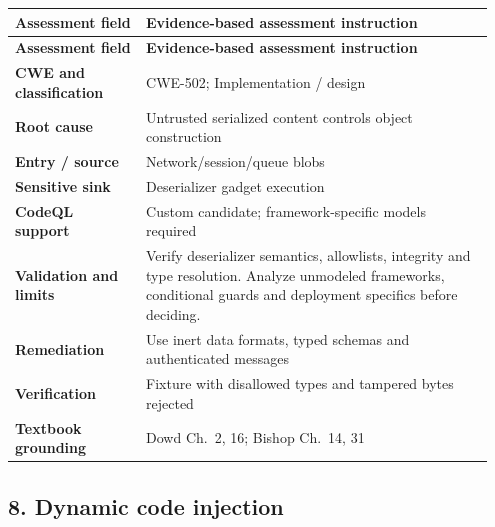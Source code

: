 \documentclass[11pt,letterpaper,oneside]{book}
\begin{document}
\small
\setlength{\tabcolsep}{2pt}
\renewcommand{\arraystretch}{1.18}
\begin{longtable}{>{\raggedright\arraybackslash}p{0.26\linewidth}>{\raggedright\arraybackslash}p{0.69\linewidth}}
\toprule
\textbf{Assessment field} & \textbf{Evidence-based assessment instruction}\\
\midrule
\endfirsthead
\toprule
\textbf{Assessment field} & \textbf{Evidence-based assessment instruction}\\
\midrule
\endhead
\textbf{CWE and classification} & CWE-502; Implementation / design\\
\textbf{Root cause} & Untrusted serialized content controls object construction\\
\textbf{Entry / source} & Network/session/queue blobs\\
\textbf{Sensitive sink} & Deserializer gadget execution\\
\textbf{CodeQL support} & Custom candidate; framework-specific models required\\
\textbf{Validation and limits} & Verify deserializer semantics, allowlists, integrity and type resolution. Analyze unmodeled frameworks, conditional guards and deployment specifics before deciding.\\
\textbf{Remediation} & Use inert data formats, typed schemas and authenticated messages\\
\textbf{Verification} & Fixture with disallowed types and tampered bytes rejected\\
\textbf{Textbook grounding} & Dowd Ch.~2, 16; Bishop Ch.~14, 31\\
\bottomrule
\end{longtable}
\normalsize

\subsection{8. Dynamic code injection}
\end{document}
